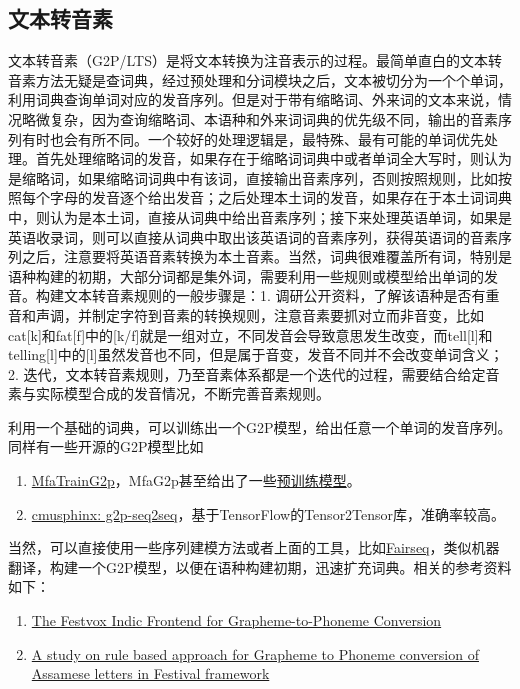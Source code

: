 \documentclass[cn,10pt,math=newtx,citestyle=gb7714-2015,bibstyle=gb7714-2015]{elegantbook}
\begin{document}
\subsection{文本转音素}

文本转音素（G2P/LTS）是将文本转换为注音表示的过程。最简单直白的文本转音素方法无疑是查词典，经过预处理和分词模块之后，文本被切分为一个个单词，利用词典查询单词对应的发音序列。但是对于带有缩略词、外来词的文本来说，情况略微复杂，因为查询缩略词、本语种和外来词词典的优先级不同，输出的音素序列有时也会有所不同。一个较好的处理逻辑是，最特殊、最有可能的单词优先处理。首先处理缩略词的发音，如果存在于缩略词词典中或者单词全大写时，则认为是缩略词，如果缩略词词典中有该词，直接输出音素序列，否则按照规则，比如按照每个字母的发音逐个给出发音；之后处理本土词的发音，如果存在于本土词词典中，则认为是本土词，直接从词典中给出音素序列；接下来处理英语单词，如果是英语收录词，则可以直接从词典中取出该英语词的音素序列，获得英语词的音素序列之后，注意要将英语音素转换为本土音素。当然，词典很难覆盖所有词，特别是语种构建的初期，大部分词都是集外词，需要利用一些规则或模型给出单词的发音。构建文本转音素规则的一般步骤是：1. 调研公开资料，了解该语种是否有重音和声调，并制定字符到音素的转换规则，注意音素要抓对立而非音变，比如cat[k]和fat[f]中的[k/f]就是一组对立，不同发音会导致意思发生改变，而tell[l]和telling[l]中的[l]虽然发音也不同，但是属于音变，发音不同并不会改变单词含义；2. 迭代，文本转音素规则，乃至音素体系都是一个迭代的过程，需要结合给定音素与实际模型合成的发音情况，不断完善音素规则。

利用一个基础的词典，可以训练出一个G2P模型，给出任意一个单词的发音序列。同样有一些开源的G2P模型比如

\begin{enumerate}
  \item \href{https://montreal-forced-aligner.readthedocs.io/en/stable/model_training.html}{MfaTrainG2p}，MfaG2p甚至给出了一些\href{https://github.com/MontrealCorpusTools/mfa-models}{预训练模型}。
  \item \href{https://github.com/cmusphinx/g2p-seq2seq}{cmusphinx: g2p-seq2seq}，基于TensorFlow的Tensor2Tensor库，准确率较高。
\end{enumerate}

当然，可以直接使用一些序列建模方法或者上面的工具，比如\href{https://github.com/pytorch/fairseq}{Fairseq}，类似机器翻译，构建一个G2P模型，以便在语种构建初期，迅速扩充词典。相关的参考资料如下：

\begin{enumerate}
  \item \href{https://www.cs.cmu.edu/~awb/papers/LREC16_parlikar.pdf}{The Festvox Indic Frontend for Grapheme-to-Phoneme Conversion}
  \item \href{https://ieeexplore.ieee.org/document/7942536}{A study on rule based approach for Grapheme to Phoneme conversion of Assamese letters in Festival framework}
\end{enumerate}
\end{document}
